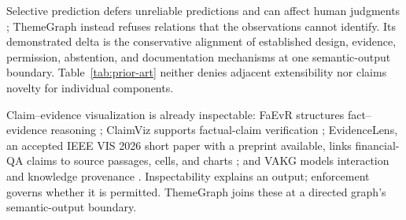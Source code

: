 \documentclass[manuscript,screen,review,anonymous]{acmart}
\begin{document}
Selective prediction defers unreliable predictions and can affect human judgments \cite{bondi2022}; ThemeGraph instead refuses relations that the observations cannot identify. Its demonstrated delta is the conservative alignment of established design, evidence, permission, abstention, and documentation mechanisms at one semantic-output boundary. Table~\ref{tab:prior-art} neither denies adjacent extensibility nor claims novelty for individual components.

Claim--evidence visualization is already inspectable: FaEvR structures fact--evidence reasoning \cite{vaidya2020}; ClaimViz supports factual-claim verification \cite{rony2020}; EvidenceLens, an accepted IEEE VIS 2026 short paper with a preprint available, links financial-QA claims to source passages, cells, and charts \cite{gu2026}; and VAKG models interaction and knowledge provenance \cite{christino2026}. Inspectability explains an output; enforcement governs whether it is permitted. ThemeGraph joins these at a directed graph's semantic-output boundary.
\end{document}
